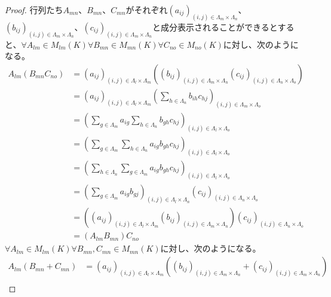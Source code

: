\documentclass[dvipdfmx]{jsarticle}
\begin{document}
\begin{proof}
行列たち$A_{mn}$、$B_{mn}$、$C_{mn}$がそれぞれ$\left( a_{ij} \right)_{(i,j) \in \varLambda_{m} \times \varLambda_{n}}$、$\left( b_{ij} \right)_{(i,j) \in \varLambda_{m} \times \varLambda_{n}}$、$\left( c_{ij} \right)_{(i,j) \in \varLambda_{m} \times \varLambda_{n}}$と成分表示されることができるとすると、$\forall A_{lm} \in M_{lm}(K)\forall B_{mn} \in M_{mn}(K)\forall C_{no} \in M_{no}(K)$に対し、次のようになる。
\begin{align*}
A_{lm}\left( B_{mn}C_{no} \right) &= \left( a_{ij} \right)_{(i,j) \in \varLambda_{l} \times \varLambda_{m}}\left( \left( b_{ij} \right)_{(i,j) \in \varLambda_{m} \times \varLambda_{n}}\left( c_{ij} \right)_{(i,j) \in \varLambda_{n} \times \varLambda_{o}} \right)\\
&= \left( a_{ij} \right)_{(i,j) \in \varLambda_{l} \times \varLambda_{m}}\left( \sum_{h \in \varLambda_{n}} {b_{ih}c_{hj}} \right)_{(i,j) \in \varLambda_{m} \times \varLambda_{o}}\\
&= \left( \sum_{g \in \varLambda_{m}} a_{ig}\sum_{h \in \varLambda_{n}} {b_{gh}c_{hj}} \right)_{(i,j) \in \varLambda_{l} \times \varLambda_{o}}\\
&= \left( \sum_{g \in \varLambda_{m}} {\sum_{h \in \varLambda_{n}} {a_{ig}b_{gh}c_{hj}}} \right)_{(i,j) \in \varLambda_{l} \times \varLambda_{o}}\\
&= \left( \sum_{h \in \varLambda_{n}} {\sum_{g \in \varLambda_{m}} {a_{ig}b_{gh}c_{hj}}} \right)_{(i,j) \in \varLambda_{l} \times \varLambda_{o}}\\
&= \left( \sum_{g \in \varLambda_{m}} {a_{ig}b_{gj}} \right)_{(i,j) \in \varLambda_{l} \times \varLambda_{n}}\left( c_{ij} \right)_{(i,j) \in \varLambda_{n} \times \varLambda_{o}}\\
&= \left( \left( a_{ij} \right)_{(i,j) \in \varLambda_{l} \times \varLambda_{m}}\left( b_{ij} \right)_{(i,j) \in \varLambda_{m} \times \varLambda_{n}} \right)\left( c_{ij} \right)_{(i,j) \in \varLambda_{n} \times \varLambda_{o}}\\
&= \left( A_{lm}B_{mn} \right)C_{no}
\end{align*}
$\forall A_{lm} \in M_{lm}(K)\forall B_{mn},C_{mn} \in M_{mn}(K)$に対し、次のようになる。
\begin{align*}
A_{lm}\left( B_{mn} + C_{mn} \right) &= \left( a_{ij} \right)_{(i,j) \in \varLambda_{l} \times \varLambda_{m}}\left( \left( b_{ij} \right)_{(i,j) \in \varLambda_{m} \times \varLambda_{n}} + \left( c_{ij} \right)_{(i,j) \in \varLambda_{m} \times \varLambda_{n}} \right)\\

\end{align*}
\end{proof}
\end{document}
